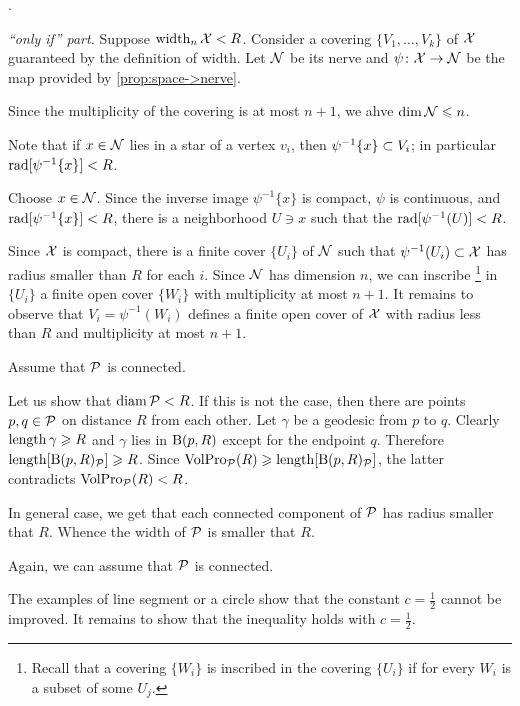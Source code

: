  \cite[Appendix 1(E$_{2}$)]{gromov-1983}.

\parbf{\ref{ex:width=suprad(inv)},} \textit{``only if'' part.}
Suppose $\operatorname{\rm width}\nolimits_n\mathcal{X}<R$.
Consider a covering $\{V_1,\dots,V_k\}$ of $\mathcal{X}$ guaranteed by the definition of width.
Let $\mathcal{N}$ be its nerve and $\psi\colon\mathcal{X}\to \mathcal{N}$ be the map provided by \ref{prop:space->nerve}.

Since the multiplicity of the covering is at most $n+1$, we ahve $\operatorname{\rm dim}\nolimits \mathcal{N}\leqslant n$.

Note that if $x\in \mathcal{N}$ lies in a star of a vertex $v_i$,
then $\psi^{-1}\{x\}\z\subset V_i$;
in particular $\mathop{\rm rad}\nolimits[\psi^{-1}\{x\}]<R$.

Choose $x\in \mathcal{N}$.
Since the inverse image $\psi^{-1}\{x\}$ is compact, $\psi$ is continuous, and $\mathop{\rm rad}\nolimits[\psi^{-1}\{x\}]<R$,
there is a neighborhood $U\ni x$ such that the  $\mathop{\rm rad}\nolimits[\psi^{-1}(U)]<R$.

Since $\mathcal{X}$ is compact,  there is a finite cover $\{U_i\}$ of $\mathcal{N}$ such that $\psi^{-1}(U_i)\subset\mathcal{X}$ has radius smaller than $R$ for each $i$.
Since $\mathcal{N}$ has dimension $n$, we can inscribe%
\footnote{Recall that a covering $\{W_i\}$ is inscribed in the covering $\{U_i\}$ if for every $W_i$ is a subset of some $U_j$.} 
in $\{U_i\}$ a finite open cover $\{W_i\}$ with multiplicity at most $n+1$.
It remains to observe that $V_i=\psi^{-1}(W_i)$ defines a finite open cover of $\mathcal{X}$ with radius less than $R$ and multiplicity at most $n+1$. 


Assume that $\mathcal{P}$ is connected.

Let us show that $\operatorname{\rm diam}\nolimits\mathcal{P}<R$.
If this is not the case, then there are points $p,q\in\mathcal{P}$ on distance $R$ from each other.
Let $\gamma$ be a geodesic from $p$ to $q$.
Clearly $\mathop{\rm length}\nolimits\gamma\geqslant R$ and $\gamma$ lies in $\mathrm{B}{}(p,R)$ except for the endpoint $q$.
Therefore $\mathop{\rm length}\nolimits[\mathrm{B}{}(p,R)_{\mathcal{P}}]\geqslant R$.
Since $\VolPro_{\spc{P}}(R)\z\ge \length[\oBall(p,R)_{\spc{P}}]$,
the latter contradicts $\operatorname{\rm VolPro}\nolimits_{\mathcal{P}}(R)<R$.

In general case, we get that each connected component of $\mathcal{P}$ has radius smaller that $R$.
Whence the width of $\mathcal{P}$ is smaller that $R$.

 Again, we can assume that $\mathcal{P}$ is connected.

The examples of line segment or a circle show that the constant $c=\tfrac12$ cannot be improved.
It remains to show that the inequality holds with $c=\tfrac12$.

